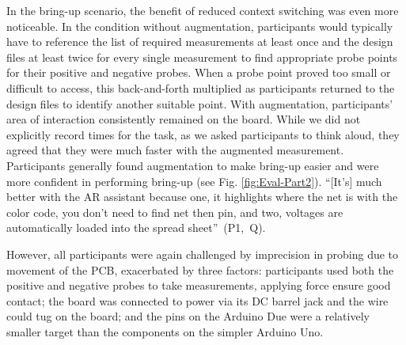 \documentclass [11pt, proquest] {uwthesis}[2020/02/24]
\newcounter{sharc}
\newcommand{\sharcHere}[1]{Q\refstepcounter{sharc}\arabic{sharc}\label{#1}}
\begin{document}
In the bring-up scenario, the benefit of reduced context switching was even more noticeable. In the condition without augmentation, participants would typically have to reference the list of required measurements at least once and the design files at least twice for every single measurement to find appropriate probe points for their positive and negative probes. When a probe point proved too small or difficult to access, this back-and-forth multiplied as participants returned to the design files to identify another suitable point. With augmentation, participants' area of interaction consistently remained on the board. While we did not explicitly record times for the task, as we asked participants to think aloud, they agreed that they were much faster with the augmented measurement. 
Participants generally found augmentation to make bring-up easier and were more confident in performing bring-up (see Fig. \ref{fig:Eval-Part2}). 
``[It's] much better with the AR assistant because one, it highlights where the net is with the color code, you don’t need to find net then pin, and two, voltages are automatically loaded into the spread sheet''~(P1,~\sharcHere{q:muchbetterar}).

However, all participants were again challenged by imprecision in probing due to movement of the PCB, exacerbated by three factors: participants used both the positive and negative probes to take measurements, applying force ensure good contact; the board was connected to power via its DC barrel jack and the wire could tug on the board; and the pins on the Arduino Due were a relatively smaller target than the components on the simpler Arduino Uno.

\end{document}
